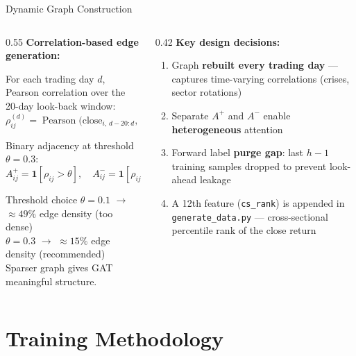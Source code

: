 \documentclass[aspectratio=169, 10pt]{beamer}
\begin{document}
\begin{frame}{Dynamic Graph Construction}
  \begin{columns}[T]
    \begin{column}{0.55\textwidth}
      \textbf{Correlation-based edge generation:}

      For each trading day $d$, Pearson correlation over the 20-day
      look-back window:
      \[
        \rho_{ij}^{(d)} = \operatorname{Pearson}\!\bigl(
          \text{close}_{i,\,d-20:d},\;
          \text{close}_{j,\,d-20:d}
        \bigr)
      \]

      Binary adjacency at threshold $\theta = 0.3$:
      \[
        A_{ij}^+ = \mathbf{1}[\rho_{ij} > \theta], \quad
        A_{ij}^- = \mathbf{1}[\rho_{ij} < -\theta]
      \]

      \begin{block}{Threshold choice}
        $\theta = 0.1$ $\to$ ${\approx}49\%$ edge density (too dense)\\
        $\theta = 0.3$ $\to$ ${\approx}15\%$ edge density (recommended)\\
        Sparser graph gives GAT meaningful structure.
      \end{block}
    \end{column}
    \begin{column}{0.42\textwidth}
      \textbf{Key design decisions:}
      \begin{enumerate}\setlength{\itemsep}{4pt}
        \item Graph \textbf{rebuilt every trading day} — captures
              time-varying correlations (crises, sector rotations)
        \item Separate $A^+$ and $A^-$ enable
              \textbf{heterogeneous} attention
        \item Forward label \textbf{purge gap}: last $h{-}1$ training
              samples dropped to prevent look-ahead leakage
        \item A 12th feature (\texttt{cs\_rank}) is appended in
              \texttt{generate\_data.py} — cross-sectional percentile
              rank of the close return
      \end{enumerate}
    \end{column}
  \end{columns}
\end{frame}

\section{Training Methodology}
\end{document}
